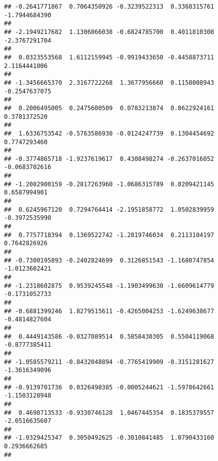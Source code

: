 \documentclass[]{article}
\begin{document}
\begin{verbatim}
## -0.2641771867  0.7064350926 -0.3239522313  0.3368315761 -1.7944684390 
##                                                                       
## -2.1949217682  1.1306866038 -0.6824785700  0.4011810308 -2.3767291704 
##                                                                       
##  0.0323553568  1.6112159945 -0.9919433650 -0.4458873711  2.1164441006 
##                                                                       
## -1.3456665370  2.3167722268  1.3677956660  0.1158008943 -0.2547637075 
##                                                                       
##  0.2006495005  0.2475600509  0.0783213874  0.8622924161  0.3781372520 
##                                                                       
##  1.6336753542 -0.5763586930 -0.0124247739  0.1304454692  0.7747293460 
##                                                                       
## -0.3774865718 -1.9237619617  0.4308498274 -0.2637016052 -0.0683702616 
##                                                                       
## -1.2082900159 -0.2817263960 -1.0686315789  0.0209421145  0.6587994901 
##                                                                       
##  0.6245967120  0.7294764414 -2.1951858772  1.0502839959 -0.3972535990 
##                                                                       
##  0.7757718394  0.1369522742 -1.2819746034  0.2113104197  0.7642826926 
##                                                                       
## -0.7300195893 -0.2402824699  0.3126851543 -1.1680747854 -1.0123602421 
##                                                                       
## -1.2318602875  0.9539245548 -1.1903499630 -1.6609614779 -0.1731052733 
##                                                                       
## -0.6881399246  1.8279515611 -0.4265004253 -1.6249638677 -0.4814827604 
##                                                                       
##  0.4449143586 -0.0327089514  0.5858430305  0.5504119068 -0.8777385411 
##                                                                       
## -1.0585579211 -0.8432048894 -0.7765419909 -0.3151281627 -1.3616349096 
##                                                                       
## -0.9139701736  0.0326498385 -0.0005244621 -1.5978642661 -1.1503128948 
##                                                                       
##  0.4690713533 -0.9330746128  1.0467445354  0.1835379557 -2.0516635607 
##                                                                       
## -1.0329425347  0.3050492625 -0.3010841485  1.0790433160  0.2936662685 
##                                                                       

\end{verbatim}
\end{document}

